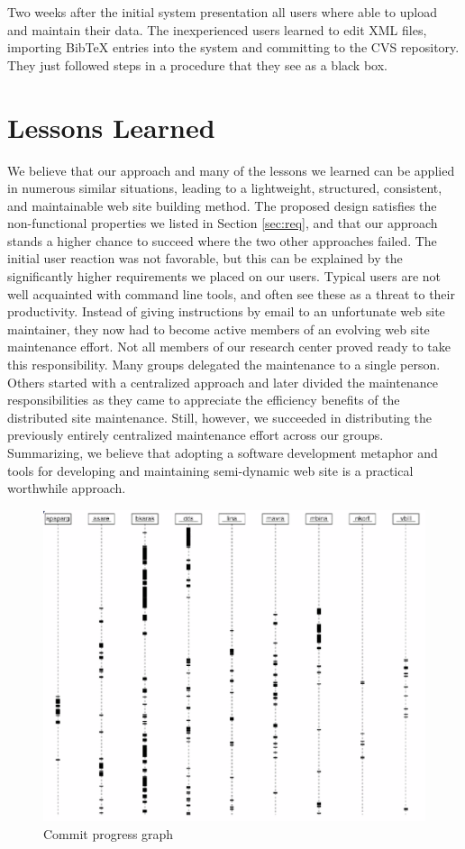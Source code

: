 \documentclass[10pt]{article}
\begin{document}
Two weeks after the initial system presentation all users where able to upload 
and maintain their data. The inexperienced users learned to edit {\sc XML} files,
importing {\sc BibTeX} entries into the system and committing to the {\sc CVS} repository. 
They just followed steps in a procedure that they see as a black box. 

\section{Lessons Learned}
\label{sec:concl}

We believe that our approach and many of the lessons we learned
can be applied in numerous similar situations,
leading to a lightweight, structured, consistent, and maintainable
web site building method. The proposed design satisfies the non-functional properties
we listed in Section \ref{sec:req},
and that our approach stands a higher chance to succeed where the
two other approaches failed.
The initial user reaction was not favorable, but this can
be explained by the significantly higher requirements we
placed on our users. Typical users are not well acquainted
with command line tools, and often see these as a threat to their productivity.
Instead of giving instructions by email to an unfortunate
web site maintainer, they now had to become active members
of an evolving web site maintenance effort.
Not all members of our research center proved ready to take
this responsibility.
Many groups delegated the maintenance to a single person. 
Others started with a centralized approach and later divided the
maintenance responsibilities as they came to appreciate the efficiency
benefits of the distributed site maintenance.
Still, however, we succeeded in distributing the previously
entirely centralized maintenance effort across our groups.
Summarizing, we believe that adopting a software development
metaphor and tools for developing and maintaining semi-dynamic
web site is a practical worthwhile approach.

\begin{figure}[h!]
\includegraphics[scale=0.6]{cvs-log.eps}
\caption{Commit progress graph}
\label{fig:cvs-log}
\end{figure}
\end{document}
